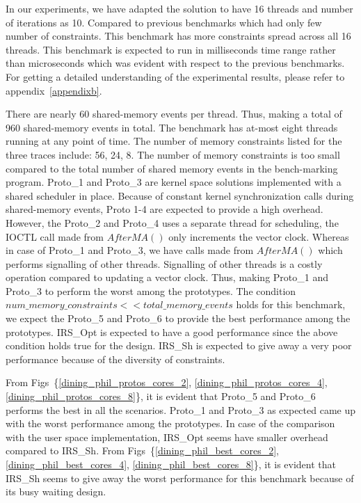 In our experiments, we have adapted the solution to have 16 threads and number of iterations as 10. 
Compared to previous benchmarks which had only few number of constraints. 
This benchmark has more constraints spread across all 16 threads. 
This benchmark is expected to run in milliseconds time range rather than microseconds which was evident with respect to the previous benchmarks. 
For getting a detailed understanding of the experimental results, please refer to appendix~\ref{appendixb}.  

There are nearly 60 shared-memory events per thread. 
Thus, making a total of 960 shared-memory events in total. 
The benchmark has at-most eight threads running at any point of time. 
The number of memory constraints listed for the three traces include: 56, 24, 8.
The number of memory constraints is too small compared to the total number of shared memory events in the bench-marking program. 
Proto\_1 and Proto\_3 are kernel space solutions implemented with a shared scheduler in place. 
Because of constant kernel synchronization calls during shared-memory events, Proto 1-4 are expected to provide a high overhead. 
However, the Proto\_2 and Proto\_4 uses a separate thread for scheduling, the IOCTL call made from $AfterMA()$ only increments the vector clock. 
Whereas in case of Proto\_1 and Proto\_3, we have calls made from $AfterMA()$ which performs signalling of other threads. Signalling of other threads is a costly operation compared to updating a vector clock. 
Thus, making Proto\_1 and Proto\_3 to perform the worst among the prototypes. 
The condition $num\_memory\_constraints << total\_memory\_events$ holds for this benchmark, we expect the Proto\_5 and Proto\_6 to provide the best performance among the prototypes.
IRS\_Opt is expected to have a good performance since the above condition holds true for the design.
IRS\_Sh is expected to give away a very poor performance because of the diversity of constraints.  

From Figs~\{\ref{dining_phil_protos_cores_2}, \ref{dining_phil_protos_cores_4}, \ref{dining_phil_protos_cores_8}\}, it is evident that Proto\_5 and Proto\_6 performs the best in all the scenarios. 
Proto\_1 and Proto\_3 as expected came up with the worst performance among the prototypes. 
In case of the comparison with the user space implementation, IRS\_Opt seems have smaller overhead compared to IRS\_Sh. 
From Figs~\{\ref{dining_phil_best_cores_2}, \ref{dining_phil_best_cores_4}, \ref{dining_phil_best_cores_8}\}, it is evident that IRS\_Sh seems to give away the worst performance for this benchmark because of its busy waiting design. 


